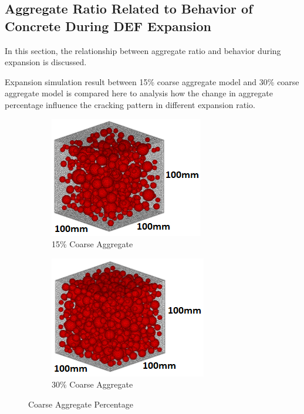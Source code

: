 \clearpage
\subsection{Aggregate Ratio Related to Behavior of Concrete During DEF Expansion}
In this section, the relationship between aggregate ratio and behavior during expansion is discussed.

Expansion simulation result between 15\% coarse aggregate model and 30\% coarse aggregate model is compared here to analysis how the change in aggregate percentage influence the cracking pattern in different expansion ratio.

\begin{figure}[!h]
\centering
\begin{subfigure}{.5\textwidth}
  \centering
  \includegraphics[width=.8\linewidth]{Files/Aggregate/A15.png}
  \caption{15\% Coarse Aggregate}
  \label{fig:A15_model}
\end{subfigure}%
\begin{subfigure}{.5\textwidth}
  \centering
  \includegraphics[width=.8\linewidth]{Files/Aggregate/A30.png}
  \caption{30\% Coarse Aggregate}
  \label{fig:A15_model}
\end{subfigure}
\caption{Coarse Aggregate Percentage}
\label{fig:Aggregate_Percentage}
\end{figure}


